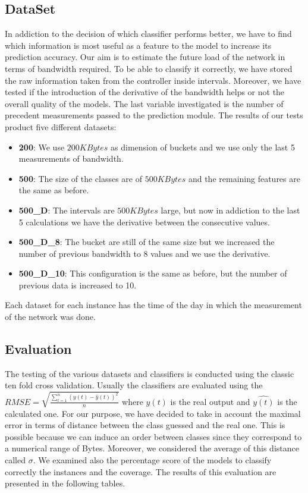 \documentclass[12pt]{article}
\begin{document}
\subsection{DataSet}
In addiction to the decision of which classifier performs better, we have to find which information is most useful as a feature to the model to increase its prediction accuracy.
Our aim is to estimate the future load of the network in terms of bandwidth required. 
To be able to classify it correctly, we have stored the raw information taken from the controller inside intervals. 
Moreover, we have tested if the introduction of the derivative of the bandwidth helps or not the overall quality of the models.
The last variable investigated is the number of precedent measurements passed to the prediction module.
The results of our tests product five different datasets:
\begin{itemize}
	\item \textbf{200}: We use $200 KBytes$ as dimension of buckets and we use only the last 5 measurements of bandwidth.
	
	\item \textbf{500}: The size of the classes are of $500 KBytes$ and the remaining features are the same as before.
	
	\item \textbf{500\_D}: The intervals are $500 KBytes$ large, but now in addiction to the last 5 calculations we have the derivative between the consecutive values.

	\item \textbf{500\_D\_8}: The bucket are still of the same size but we increased the number of previous bandwidth to 8 values and we use the derivative.
	\item \textbf{500\_D\_10}: This configuration is the same as before, but the number of previous data is increased to 10.
\end{itemize}
Each dataset for each instance has the time of the day in which the measurement of the network was done.

\subsection{Evaluation}
The testing of the various datasets and classifiers is conducted using the classic ten fold cross validation.
Usually the classifiers are evaluated using the $RMSE = \sqrt{ \frac{ \sum_{t=1}^{n} (y(t) - \hat{y}(t))^2  }{n}  }$ where $y(t)$ is the real output and $\hat{y(t)}$ is the calculated one.
For our purpose, we have decided to take in account the maximal error in terms of distance between the class guessed and the real one.
This is possible because we can induce an order between classes since they correspond to a numerical range of Bytes. 
Moreover, we considered the average of this distance called $\sigma$.
We examined also the percentage score of the models to classify correctly the instances and the coverage.
The results of this evaluation are presented in the following tables.
\end{document}
